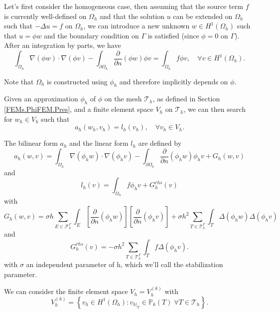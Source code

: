 Let's first consider the homogeneous case, then assuming that the source term $f$ is currently well-defined on $\Omega_h$ and that the solution $u$ can be extended on $\Omega_h$ such that $-\Delta u=f$ on $\Omega_h$, we can introduce a new unknown $w\in H^1(\Omega_h)$ such that $u=\phi w$ and the boundary condition on $\Gamma$ is satisfied (since $\phi=0$ on $\Gamma$). After an integration by parts, we have
\begin{equation*}
	\int_{\Omega_h}\nabla(\phi w)\cdot\nabla(\phi v)-\int_{\partial\Omega_h}\frac{\partial}{\partial n}(\phi w)\phi v=\int_{\Omega_h} f\phi v,\quad \forall v\in H^1(\Omega_h).
\end{equation*}
\begin{Rem}
	Note that $\Omega_h$ is constructed using $\phi_h$ and therefore implicitly depends on $\phi$.
\end{Rem}
Given an approximation $\phi_h$ of $\phi$ on the mesh $\mathcal{T}_h$, as defined in Section \ref{FEMs.PhiFEM.Pres}, and a finite element space $V_h$ on $\mathcal{T}_h$, we can then search for $w_h\in V_h$ such that
\begin{equation*}
	a_h(w_h,v_h)=l_h(v_h), \quad \forall v_h\in V_h.
\end{equation*}

The bilinear form $a_h$ and the linear form $l_h$ are defined by
\begin{equation*}
	a_h(w,v)=\int_{\Omega_h} \nabla (\phi_h w) \cdot \nabla (\phi_h v) - \int_{\partial\Omega_h} \frac{\partial}{\partial n}(\phi_h w)\phi_h v+G_h(w,v)
\end{equation*}
and
\begin{equation*}
	l_h(v)=\int_{\Omega_h} f \phi_h v + G_h^{rhs}(v)
\end{equation*}
with
\begin{equation*}
G_h(w,v)=\sigma h\sum_{E\in\mathcal{F}_h^\Gamma} \int_E \left[\frac{\partial}{\partial n}(\phi_h w)\right] \left[\frac{\partial}{\partial n}(\phi_h v)\right]+\sigma h^2\sum_{T\in\mathcal{T}_h^\Gamma} \int_{T} \Delta(\phi_h w)\Delta(\phi_h v)
\end{equation*}
and
\begin{equation*}
G_h^{rhs}(v)=-\sigma h^2\sum_{T\in\mathcal{T}_h^\Gamma} \int_{T} f \Delta(\phi_h v).
\end{equation*}
with $\sigma$ an independent parameter of h, which we'll call the stabilization parameter.

We can consider the finite element space $V_h=V_h^{(k)}$ with
\begin{equation*}
	V_h^{(k)}=\left\{v_h\in H^1(\Omega_h):v_{h|_T}\in\mathbb{P}_k(T) \;  \forall T\in\mathcal{T}_h\right\}.
\end{equation*}

